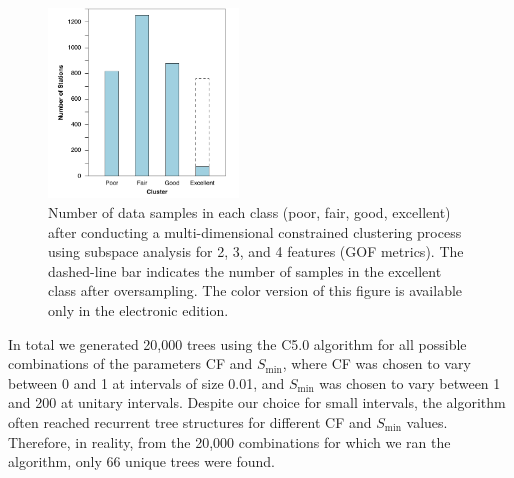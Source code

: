 
\begin{figure}[t]
	\centering
	\includegraphics[width=0.45\textwidth]{figures/pdf/figure-07}
	\caption{Number of data samples in each class (poor, fair, good, excellent) after conducting a multi-dimensional constrained \kmeans{} clustering process using subspace analysis for 2, 3, and 4 features (GOF metrics). The dashed-line bar indicates the number of samples in the excellent class after oversampling. The color version of this figure is available only in the electronic edition.}
	\label{fig:count-classes}
\end{figure}

In total we generated 20,000 trees using the C5.0 algorithm for all possible combinations of the parameters CF and $S_{\min}$, where CF was chosen to vary between 0 and 1 at intervals of size 0.01, and $S_{\min}$ was chosen to vary between 1 and 200 at unitary intervals. Despite our choice for small intervals, the algorithm often reached recurrent tree structures for different CF and $S_{\min}$ values. Therefore, in reality, from the 20,000 combinations for which we ran the algorithm, only 66 unique trees were found. 

